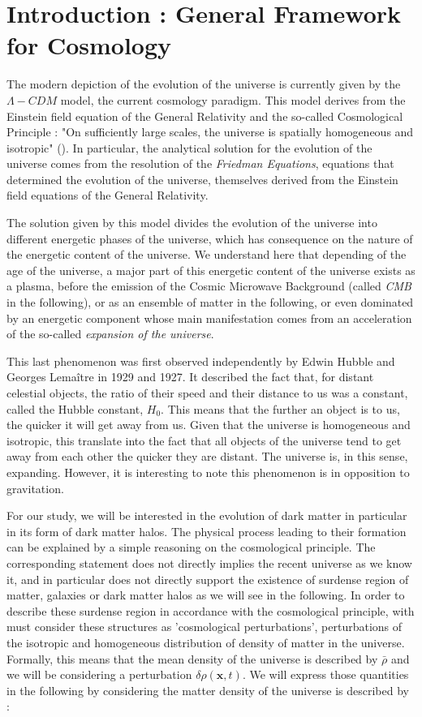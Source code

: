 \section*{Introduction : General Framework for Cosmology}

The modern depiction of the evolution of the universe is currently given by the $\Lambda -CDM$ model, the current cosmology paradigm. This model derives from the Einstein field equation of the General Relativity and the so-called Cosmological Principle : "On sufficiently large scales, the universe is spatially homogeneous and isotropic" (\cite{MBW}). In particular, the analytical solution for the evolution of the universe comes from the resolution of the \textit{Friedman Equations}, equations that determined the evolution of the universe, themselves derived from the Einstein field equations of the General Relativity.

The solution given by this model divides the evolution of the universe into different energetic phases of the universe, which has consequence on the nature of the energetic content of the universe. We understand here that depending of the age of the universe, a major part of this energetic content of the universe exists as a plasma, before the emission of the Cosmic Microwave Background (called \textit{CMB} in the following), or as an ensemble of matter in the following, or even dominated by an energetic component whose main manifestation comes from an acceleration of the so-called \textit{expansion of the universe}.

This last phenomenon was first observed independently by Edwin Hubble and Georges Lemaître in 1929 and 1927. It described the fact that, for distant celestial objects, the ratio of their speed and their distance to us was a constant, called the Hubble constant, $H_0$. This means that the further an object is to us, the quicker it will get away from us. Given that the universe is homogeneous and isotropic, this translate into the fact that all objects of the universe tend to get away from each other the quicker they are distant. The universe is, in this sense, expanding. However, it is interesting to note this phenomenon is in opposition to gravitation.

For our study, we will be interested in the evolution of dark matter in particular in its form of dark matter halos. The physical process leading to their formation can be explained by a simple reasoning on the cosmological principle. The corresponding statement does not directly implies the recent universe as we know it, and in particular does not directly support the existence of surdense region of matter, galaxies or dark matter halos as we will see in the following. In order to describe these surdense region in accordance with the cosmological principle, with must consider these structures as 'cosmological perturbations', perturbations of the isotropic and homogeneous distribution of density of matter in the universe. Formally, this means that the mean density of the universe is described by $\bar{\rho}$ and we will be considering a perturbation $\delta \rho (\textbf{x}, t)$. We will express those quantities in the following by considering the matter density of the universe is described by :

